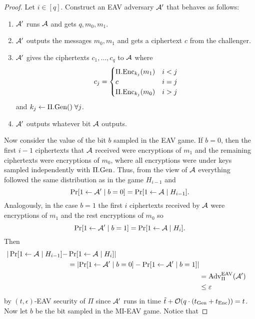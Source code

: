 \begin{proof}
	Let $i \in [q]$. Construct an EAV adversary $\mathcal{A}'$ that behaves as follows:
	\begin{enumerate}[1.]
		\item $\mathcal{A}'$ runs $\mathcal{A}$ and gets $q, m_0, m_1$.
		\item $\mathcal{A}'$ outputs the messages $m_0, m_1$ and gets a ciphertext $c$ from the challenger.
		\item $\mathcal{A}'$ gives the ciphertexts $c_1, \ldots, c_q$ to $\mathcal{A}$ where
		      \[
			      c_j = \begin{cases}
				      \Pi.\mathrm{Enc}_{k_j}(m_1) & i < j \\
				      c                   & i = j \\
				      \Pi.\mathrm{Enc}_{k_j}(m_0) & i > j
			      \end{cases}
		      \]
		      and $k_j \leftarrow \Pi.\mathrm{Gen}() \; \forall j$.
		\item $\mathcal{A}'$ outputs whatever bit $\mathcal{A}$ outputs.
	\end{enumerate}
	Now consider the value of the bit $b$ sampled in the EAV game. If $b = 0$, then the first $i - 1$ ciphertexts that $\mathcal{A}$ received were encryptions of $m_1$ and the remaining ciphertexts were encryptions of $m_0$, where all encryptions were under keys sampled independently with $\Pi.\mathrm{Gen}$. Thus, from the view of $\mathcal{A}$ everything followed the same distribution as in the game $H_{i - 1}$ and
	\[
		\pr{1 \from \adv' \mid b = 0} = \pr{1 \from \adv \mid H_{i - 1}}.
	\]
	Analogously, in the case $b = 1$ the first $i$ ciphertexts received by $\mathcal{A}$ were encryptions of $m_1$ and the rest encryptions of $m_0$ so
	\[
		\pr{1 \from \adv' \mid b = 1} = \pr{1 \from \adv \mid H_{i}}.
	\]
	Then
	\begin{align} \label{eq:eav-to-mi-eav-hybrid-distinguisher}
		\begin{split}
			\begin{split}
				| \pr{1 \from \adv \mid H_{i - 1}} - & \pr{1 \from \adv \mid H_{i}} | \\
				& = \abs*{\pr{1 \from \adv' \mid b = 0} - \pr{1 \from \adv' \mid b = 1}}
			\end{split} \\
			& = \mathrm{Adv}_{\Pi}^{\mathrm{EAV}}(\adv')                                         \\
			& \le \epsilon
		\end{split}
	\end{align}
	by $(t, \epsilon)$-EAV security of $\Pi$ since $\mathcal{A}'$ runs in time $\tilde{t} + \mathcal{O}(q \cdot (t_{\mathrm{Gen}} + t_{\mathrm{Enc}})) = t$. Now let $b$ be the bit sampled in the MI-EAV game. Notice that

\end{proof}
